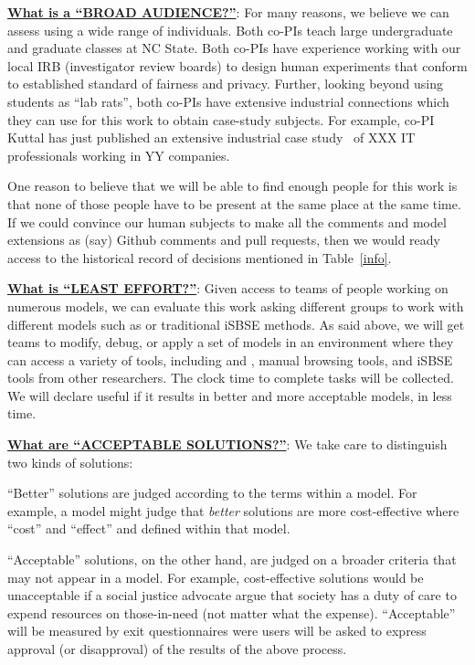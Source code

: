  \underline{\bf What is a ``BROAD AUDIENCE?''}: 
  For many reasons, we believe we can assess {\ITTT}
 using   a wide range of  individuals.
 Both co-PIs teach large
 undergraduate and graduate classes at NC State. Both co-PIs have experience
 working with our local IRB (investigator review boards) to design
 human experiments that conform to established standard of fairness and privacy.
 Further, looking beyond using students as ``lab rats'', both co-PIs have extensive industrial connections which they can use for this work to obtain
 case-study  subjects. For example, co-PI Kuttal has just published an extensive industrial case study~\cite{XXX}  of XXX IT professionals working in YY companies.    
 
 

One reason to believe that we will be able to find enough people for this work is that none of those people have to be present at the same place at the same time. If we could convince our human subjects to make all the comments and model extensions as (say) Github comments and pull requests, then we would ready access
 to the historical record of decisions mentioned in 
 Table~\ref{info}.

 
 

 \underline{\bf What is ``LEAST EFFORT?''}:
 Given access to teams of people working on numerous models,
we can evaluate this work asking different groups to work with different models such as {\ITTT} or
traditional iSBSE
methods.
As said above, we will get teams
to modify, debug, or apply
a set of models in an environment where they can access a variety of tools, including {\ITTT} and {}, manual browsing tools,
and iSBSE tools from other researchers.  The clock time to complete tasks will be collected. We will declare {\ITTT} useful
if it results in better and more acceptable models,
in less time.
 
\underline{\bf What are ``ACCEPTABLE SOLUTIONS?''}:
We take care to distinguish two kinds 
of   solutions:
\bi
\item ``Better'' solutions
are judged according
to the terms within a  model.
For example, a model might judge that  
 {\em better}
solutions are more cost-effective  where
``cost'' and ``effect'' and defined
within that model.
\item  ``Acceptable'' solutions, 
on the other hand, are judged on a broader criteria
that may not appear in a model. 
For example, cost-effective solutions
would be  unacceptable if a social justice
advocate    argue
 that society has a duty of care to expend
 resources on those-in-need (not matter what the expense).
 \ei
 ``Acceptable'' will be measured by  exit questionnaires were users will be asked to express   approval (or disapproval) of the results of the above process.


